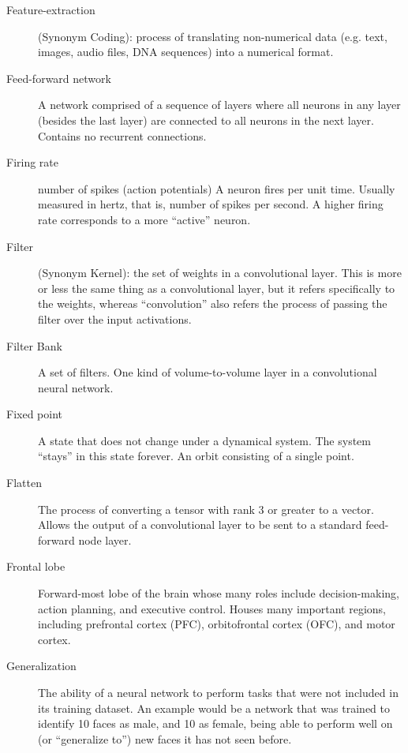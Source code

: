 \begin{description}
\item[Feature-extraction] (Synonym Coding):  process of translating non-numerical data (e.g. text, images, audio files, DNA sequences) into a numerical format. %

\item[Feed-forward network] A network comprised of a sequence of layers where all neurons in any layer (besides the last layer) are connected to all neurons in the next layer. Contains no recurrent connections.

\item[Firing rate] number of spikes (action potentials) A neuron fires per unit time. Usually measured in hertz, that is, number of spikes per second. A higher firing rate corresponds to a more ``active'' neuron. 

\item[Filter] (Synonym Kernel): the set of weights in a convolutional layer. This is more or less the same thing as a convolutional layer, but it refers specifically to the weights, whereas ``convolution'' also refers the process of passing the filter over the input activations.

\item[Filter Bank] A set of filters. One kind of volume-to-volume layer in a convolutional neural network. 

\item[Fixed point] A state that does not change under a dynamical system. The system ``stays'' in this state forever. An orbit consisting of a single point.

\item[Flatten] The process of converting a tensor with rank 3 or greater to a vector.  Allows the output of a convolutional layer to be sent to a standard feed-forward node layer.

\item[Frontal lobe] Forward-most lobe of the brain whose many roles include decision-making, action planning, and executive control. Houses many important regions, including prefrontal cortex (PFC), orbitofrontal cortex (OFC), and motor cortex. 


\item[Generalization] The ability of a neural network to perform tasks that were not included in its training dataset. An example would be a network that was trained to identify 10 faces as male, and 10 as female, being able to perform well on (or ``generalize to'') new faces it has not seen before.


\end{description}

